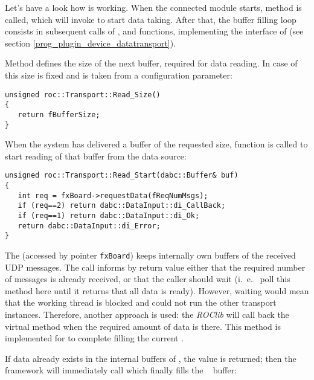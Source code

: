 Let's have a look how  is working.
When the connected module starts, method  is called,
which will invoke  to start data taking. 
After that, the buffer filling loop consists in subsequent calls of ,  and 
functions, implementing the interface of  
(see section \ref{prog_plugin_device_datatransport}). 

Method  defines the size of the next buffer, 
required for data reading. In case of  this size
is fixed and is taken from a configuration parameter:  

\begin{small}
\begin{verbatim}
unsigned roc::Transport::Read_Size()
{
   return fBufferSize;
}
\end{verbatim}
\end{small}
    
When the system has delivered a buffer of the requested size,  
function  is called to start reading 
of that buffer from the data source:

\begin{small}
\begin{verbatim}
unsigned roc::Transport::Read_Start(dabc::Buffer& buf)
{
   int req = fxBoard->requestData(fReqNumMsgs);
   if (req==2) return dabc::DataInput::di_CallBack;
   if (req==1) return dabc::DataInput::di_Ok;
   return dabc::DataInput::di_Error;
}
\end{verbatim}
\end{small}

The  (accessed by pointer {\tt fxBoard})
keeps internally  own buffers of the received UDP messages.
The call  informs by return value
either that the required number of messages is already received,
or that the caller should wait (i.~e.~ poll this method here until
it returns that all data is ready). 
However, waiting would mean that the working thread is blocked and 
could not run the other transport instances. Therefore, another approach is used: 
the {\em ROClib} will call back the virtual method   
when the required amount of data is there. This method
is implemented for  to complete filling the current
.

If data already exists in the internal buffers of ,
the value  
is returned; then the  framework will immediately call  which finally fills the \dabc~ buffer:

